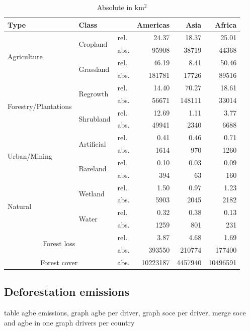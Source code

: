 	\begin{table}[ht]
		\centering
		\caption[Deforestation driver]{Absolute in km$^2$}
		\label{tab:driver_tab}
		\begin{tabular}{lllrrr}
			Type & Class & & Americas & Asia & Africa \\\hline
			\multirow{4}{*}{Agriculture} & \multirow{2}{*}{Cropland} & rel. & 24.37 & 18.37 & 25.01 \\
			& & abs. & 95908 & 38719 & 44368 \\
			& \multirow{2}{*}{Grassland} & rel. & 46.19 & 8.41 & 50.46 \\
			& & abs. & 181781 & 17726 & 89516 \\
			\multirow{4}{*}{Forestry/Plantations} & \multirow{2}{*}{Regrowth} & rel. & 14.40 & 70.27 & 18.61 \\
			& & abs. & 56671 & 148111 & 33014 \\
			& \multirow{2}{*}{Shrubland} & rel. & 12.69 & 1.11 & 3.77 \\
			& & abs. & 49941 & 2340 & 6688 \\
			\multirow{4}{*}{Urban/Mining} & \multirow{2}{*}{Artificial} & rel. & 0.41 & 0.46 & 0.71 \\
			& & abs. & 1614 & 970 & 1260 \\
			& \multirow{2}{*}{Bareland} & rel. & 0.10 & 0.03 & 0.09 \\
			& & abs. & 394 & 63 & 160 \\
			\multirow{4}{*}{Natural} & \multirow{2}{*}{Wetland} & rel. & 1.50 & 0.97 & 1.23 \\
			& & abs. & 5903 & 2045 & 2182 \\
			& \multirow{2}{*}{Water} & rel. & 0.32 & 0.38 & 0.13 \\
			& & abs. & 1259 & 801 & 231 \\\hline
			\multicolumn{2}{c}{\multirow{2}{*}{Forest loss}} & rel. & 3.87 & 4.68 & 1.69 \\
			& & abs. & 393550 & 210774 & 177400 \\
			\multicolumn{2}{c}{Forest cover} & abs. & 10223187 & 4457940 & 10496591 \\\hline
		\end{tabular}
	\end{table}

\clearpage
\subsection{Deforestation emissions}
		{\color{red} table agbe emissions, graph agbe per driver, graph soce per driver, merge soce and agbe in one graph}
		{\color{red} drivers per country}

